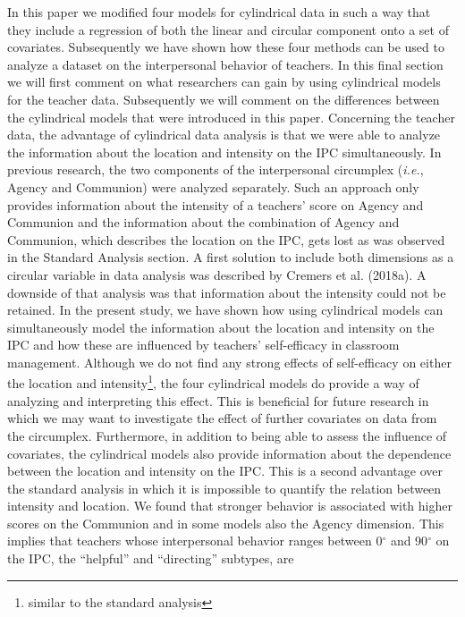 \documentclass[man,mask]{apa6}
\let\rmarkdownfootnote\footnote%
\def\footnote{\protect\rmarkdownfootnote}
\begin{document}
In this paper we modified four models for cylindrical data in such a way that
they include a regression of both the linear and circular component onto a set of
covariates. Subsequently we have shown how these four methods can be used to
analyze a dataset on the interpersonal behavior of teachers. In this final
section we will first comment on what researchers can gain by using cylindrical
models for the teacher data. Subsequently we will comment on the differences
between the cylindrical models that were introduced in this paper.\newline
\indent Concerning the teacher data, the advantage of cylindrical data analysis
is that we were able to analyze the information about the location and intensity
on the IPC simultaneously. In previous research, the two components of the
interpersonal circumplex (\emph{i.e.}, Agency and Communion) were analyzed
separately. Such an approach only provides information about the intensity of a
teachers' score on Agency and Communion and the information about the
combination of Agency and Communion, which describes the location on the IPC,
gets lost as was observed in the Standard Analysis section. A first solution to
include both dimensions as a circular variable in data analysis was described by
Cremers et al. (2018a). A downside of that analysis was that information about
the intensity could not be retained. In the present study, we have shown how
using cylindrical models can simultaneously model the information about the
location and intensity on the IPC and how these are influenced by teachers'
self-efficacy in classroom management. Although we do not find any strong
effects of self-efficacy on either the location and intensity\footnote{similar
to the standard analysis}, the four cylindrical models do provide a way of
analyzing and interpreting this effect. This is beneficial for future research
in which we may want to investigate the effect of further covariates on data
from the circumplex. \newline
\indent Furthermore, in addition to being able to assess the influence of
covariates, the cylindrical models also provide information about the dependence
between the location and intensity on the IPC. This is a second advantage over
the standard analysis in which it is impossible to quantify the relation between
intensity and location. We found that stronger behavior is associated with
higher scores on the Communion and in some models also the Agency dimension.
This implies that teachers whose interpersonal behavior ranges between
0\(^\circ\) and 90\(^\circ\) on the IPC, the \enquote{helpful} and \enquote{directing} subtypes, are
\end{document}
